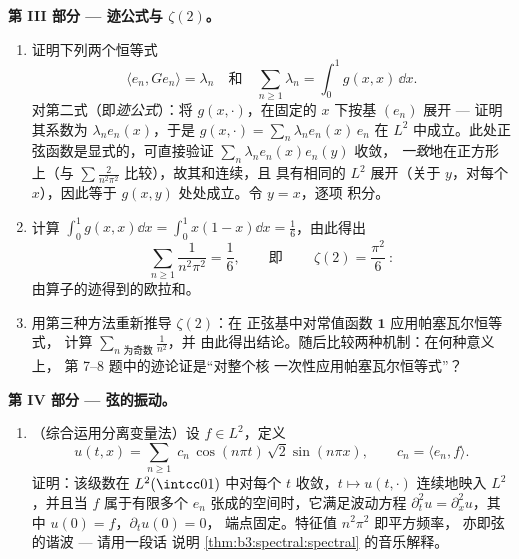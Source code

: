 \begin{problem}
\medskip
\noindent\textbf{第 III 部分 --- 迹公式与
$\zeta(2)$。}
\begin{enumerate}[resume]
  \item 证明下列两个恒等式
        \[
        \langle e_n, Ge_n\rangle = \lambda_n
        \quad\text{和}\quad
        \sum_{n\geq1}\lambda_n = \int_0^1 g(x,x)\,\dd x .
        \]
        对第二式（即\emph{迹公式}）：将
        $g(x, \cdot)$，在固定的 $x$ 下按基 $(e_n)$ 展开 ---
        证明其系数为 $\lambda_ne_n(x)$，于是
        $g(x, \cdot) = \sum_n\lambda_ne_n(x)\,e_n$ 在
        $L^2$ 中成立。此处正弦函数是显式的，可直接验证
        $\sum_n\lambda_ne_n(x)e_n(y)$ 收敛，
        \emph{一致}地在正方形上（与 $\sum
        \frac2{n^2\pi^2}$ 比较），故其和连续，且
        具有相同的 $L^2$ 展开（关于 $y$，对每个 $x$），因此等于
        $g(x,y)$ 处处成立。令 $y = x$，逐项
        积分。
  \item 计算 $\int_0^1g(x,x)\dd x = \int_0^1x(1-x)\dd x =
        \frac16$，由此得出
        \[
        \sum_{n\geq1}\frac{1}{n^2\pi^2} = \frac16,
        \qquad\text{即}\qquad
        \boxed{\ \zeta(2) = \frac{\pi^2}{6}\ } :
        \]
        由算子的迹得到的欧拉和。
  \item 用第三种方法重新推导 $\zeta(2)$：在
        正弦基中对常值函数 $\mathbf 1$ 应用帕塞瓦尔恒等式，
        计算 $\sum_{n \text{ 为奇数}}\frac1{n^2}$，并
        由此得出结论。随后比较两种机制：在何种意义上，
        第 7--8 题中的迹论证是“对整个核
        一次性应用帕塞瓦尔恒等式”？
\end{enumerate}

\medskip
\noindent\textbf{第 IV 部分 --- 弦的振动。}
\begin{enumerate}[resume]
  \item （综合运用分离变量法）设 $f \in
        L^2$，定义
        \[
        u(t, x) = \sum_{n\geq1}\;c_n\,
        \cos(n\pi t)\,\sqrt2\sin(n\pi x),
        \qquad c_n = \langle e_n, f\rangle .
        \]
        证明：该级数在 $L^2(\intcc01)$ 中对每个
        $t$ 收敛，$t\mapsto u(t, \cdot)$ 连续地映入
        $L^2$，并且当 $f$ 属于有限多个
        $e_n$ 张成的空间时，它满足波动方程 $\partial_t^2u =
        \partial_x^2u$，其中 $u(0) = f$，$\partial_tu(0) = 0$，
        端点固定。特征值 $n^2\pi^2$ 即平方频率，
        亦即弦的谐波 --- 请用一段话
        说明
        \cref{thm:b3:spectral:spectral} 的音乐解释。
\end{enumerate}


\end{problem}
